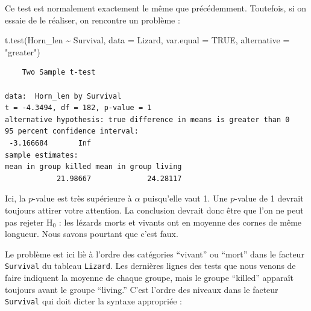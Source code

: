 \documentclass[
  a4paper,
]{article}
\newenvironment{Shaded}{\begin{snugshade}}{\end{snugshade}}
\newcommand{\AttributeTok}[1]{\textcolor[rgb]{0.00,0.34,0.68}{#1}}
\newcommand{\ConstantTok}[1]{\textcolor[rgb]{0.67,0.33,0.00}{#1}}
\newcommand{\FunctionTok}[1]{\textcolor[rgb]{0.39,0.29,0.61}{#1}}
\newcommand{\NormalTok}[1]{\textcolor[rgb]{0.12,0.11,0.11}{#1}}
\newcommand{\SpecialCharTok}[1]{\textcolor[rgb]{0.24,0.68,0.91}{#1}}
\newcommand{\StringTok}[1]{\textcolor[rgb]{0.75,0.01,0.01}{#1}}
\begin{document}
Ce test est normalement exactement le même que précédemment. Toutefois, si on essaie de le réaliser, on rencontre un problème :

\begin{Shaded}
\begin{Highlighting}[]
\FunctionTok{t.test}\NormalTok{(Horn\_len }\SpecialCharTok{\textasciitilde{}}\NormalTok{ Survival, }
       \AttributeTok{data =}\NormalTok{ Lizard, }\AttributeTok{var.equal =} \ConstantTok{TRUE}\NormalTok{,}
       \AttributeTok{alternative =} \StringTok{"greater"}\NormalTok{)}
\end{Highlighting}
\end{Shaded}

\begin{verbatim}
    Two Sample t-test

data:  Horn_len by Survival
t = -4.3494, df = 182, p-value = 1
alternative hypothesis: true difference in means is greater than 0
95 percent confidence interval:
 -3.166684       Inf
sample estimates:
mean in group killed mean in group living 
            21.98667             24.28117 
\end{verbatim}

Ici, la \(p\)-value est très supérieure à \(\alpha\) puisqu'elle vaut 1. Une \(p\)-value de 1 devrait toujours attirer votre attention. La conclusion devrait donc être que l'on ne peut pas rejeter H\(_0\) : les lézards morts et vivants ont en moyenne des cornes de même longueur. Nous savons pourtant que c'est faux.

Le problème est ici liè à l'ordre des catégories ``vivant'' ou ``mort'' dans le facteur \texttt{Survival} du tableau \texttt{Lizard}. Les dernières lignes des tests que nous venons de faire indiquent la moyenne de chaque groupe, mais le groupe ``killed'' apparaît toujours avant le groupe ``living.'' C'est l'ordre des niveaux dans le facteur \texttt{Survival} qui doit dicter la syntaxe appropriée :

\begin{Shaded}
\end{Shaded}
\end{document}
